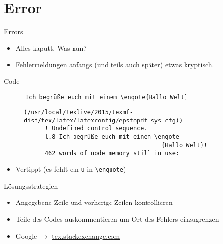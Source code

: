 \section{Error}
\begin{frame}[fragile]{Errors}
  \begin{itemize}
    \item Alles kaputt. Was nun?
    \item Fehlermeldungen anfangs (und teils auch später) etwas kryptisch.
  \end{itemize}
  \begin{block}{Code}
    \begin{lstlisting}
      Ich begrüße euch mit einem \enqote{Hallo Welt}
    \end{lstlisting}
  \end{block}
  \begin{figure}
    \centering
    \begin{lstlisting}[keywordstyle={}, texcsstyle={}]
      (/usr/local/texlive/2015/texmf-dist/tex/latex/latexconfig/epstopdf-sys.cfg))
      ! Undefined control sequence.
      l.8 Ich begrüße euch mit einem \enqote
                                       {Hallo Welt}!
      462 words of node memory still in use:
    \end{lstlisting}
  \end{figure}
  \huge
  \begin{itemize}
    \item<2->[$\Rightarrow$] Vertippt (es fehlt ein \verb+u+ in \lstinline+\enquote+)
  \end{itemize}
\end{frame}

\begin{frame}{Lösungsstrategien}
  \Large
  \begin{itemize}
    \item Angegebene Zeile und vorherige Zeilen kontrollieren
    \item Teile des Codes auskommentieren um Ort des Fehlers einzugrenzen
    \item Google $\rightarrow$ \href{http://tex.stackexchange.com}{tex.stackexchange.com}
  \end{itemize}
\end{frame}
